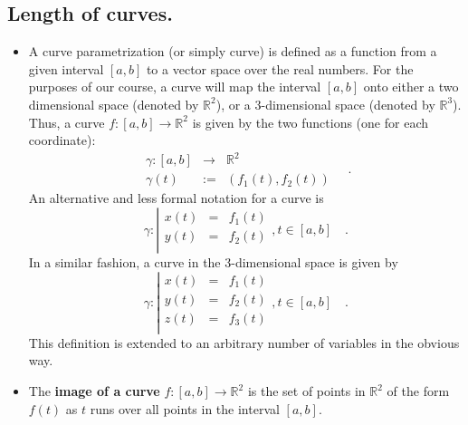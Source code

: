 \documentclass[12pt]{book}
\newcommand{\eqdef}{\textbf{:=}}
\renewcommand{\emph}{\textbf}
\begin{document}
\subsection{Length of curves.}\label{secCurveLength}
\begin{itemize}
\item {} A curve parametrization (or simply curve) is defined as a function from a given interval $[a,b]$ to a vector space over the real numbers. For the purposes of our course, a curve will map the interval $[a,b]$ onto either a two dimensional space (denoted by $\mathbb R^2$), or a 3-dimensional space (denoted by $\mathbb R^3$). Thus, a curve $f:[a,b]\to \mathbb R^2$ is given by the two functions (one for each coordinate):
\[
\begin{array}{rcl}
\gamma:[a,b]&\to& \mathbb R^2\\
\gamma(t)&\eqdef& (f_1(t), f_2(t))
\end{array}\quad .
\]
An alternative and less formal notation for a curve is
\[
\gamma:\left| 
\begin{array}{rcl}
x(t)&=&f_1(t)\\
y(t)&=&f_2(t)\\
\end{array}\right., t\in [a,b]\quad .
\]
In a similar fashion, a curve in the 3-dimensional space is given by 
\[
\gamma:\left| 
\begin{array}{rcl}
x(t)&=&f_1(t)\\
y(t)&=&f_2(t)\\
z(t)&=&f_3(t)\\
\end{array}\right., t\in [a,b]\quad .
\]
This definition is extended to an arbitrary number of variables in the obvious way.
\item {}The \emph{image of a curve} $f:[a,b]\to \mathbb R^2$ is the set of points in $\mathbb R^2$ of the form $f(t)$ as $t$ runs over all points in the interval $[a,b]$.


\end{itemize}
\end{document}

